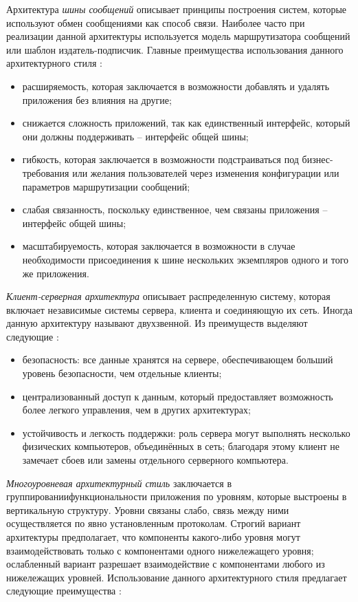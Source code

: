 Архитектура \emph{шины сообщений} описывает принципы построения систем, которые используют обмен сообщениями как способ связи. Наиболее часто при реализации данной архитектуры используется модель маршрутизатора сообщений или шаблон издатель-подписчик. Главные преимущества использования данного архитектурного стиля \cite{application_architecture_guide}:

\begin{itemize}
	\item расширяемость, которая заключается в возможности добавлять и удалять приложения без влияния на другие;
	\item снижается сложность приложений, так как единственный интерфейс, который они должны поддерживать -- интерфейс общей шины;
	\item гибкость, которая заключается в возможности подстраиваться под биз\-нес-требования или желания пользователей через изменения конфигурации или параметров маршрутизации сообщений;
	\item слабая связанность, поскольку единственное, чем связаны приложения -- интерфейс общей шины;
	\item масштабируемость, которая заключается в возможности в случае необходимости присоединения к шине нескольких экземпляров одного и того же приложения.
\end{itemize}

\emph{Клиент-серверная архитектура} описывает распределенную систему, которая включает независимые системы сервера, клиента и соединяющую их сеть. Иногда данную архитектуру называют двухзвенной. Из преимуществ выделяют следующие \cite{architecture_volosevich}:

\begin{itemize}
	\item безопасность: все данные хранятся на сервере, обеспечивающем больший уровень безопасности, чем отдельные клиенты;
	\item централизованный доступ к данным, который предоставляет возможность более легкого управления, чем в других архитектурах;
	\item устойчивость и легкость поддержки: роль сервера могут выполнять несколько физических компьютеров, объединённых в сеть; благодаря этому клиент не замечает сбоев или замены отдельного серверного компьютера.
\end{itemize}

\emph{Многоуровневая архитектурный стиль} заключается в группировании функциональности приложения по уровням, которые выстроены в вертикальную структуру. Уровни связаны слабо, связь между ними осуществляется по явно установленным протоколам. Строгий вариант архитектуры предполагает, что компоненты какого-либо уровня могут взаимодействовать только с компонентами одного нижележащего уровня; ослабленный вариант разрешает взаимодействие с компонентами любого из нижележащих уровней. Использование данного архитектурного стиля предлагает следующие преимущества \cite{application_architecture_guide}:

